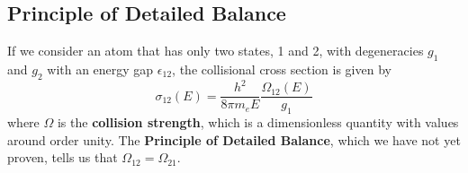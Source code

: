 \documentclass[10pt]{article}
\numberwithin{equation}{section}
\begin{document}
\subsection{Principle of Detailed Balance} %
\label{sub:detailed_bal}
  If we consider an atom that has only two states, 1 and 2, with degeneracies
  $g_1$ and $g_2$ with an energy gap $\epsilon_{12}$, the collisional cross
  section is given by
  \begin{equation}
    \label{eq:coll:3} \sigma_{12}(E) = \frac{h^2}{8\pi m_e
    E}\frac{\Omega_{12}(E)}{g_1}
  \end{equation}
  where $\Omega$ is the \textbf{collision strength}, which is a dimensionless
  quantity with values around order unity. The \textbf{Principle of Detailed
  Balance}, which we have not yet proven, tells us that
  $\Omega_{12}=\Omega_{21}$.\\
  
\end{document}
